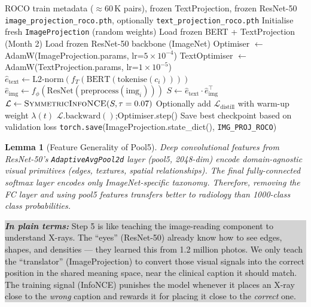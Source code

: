 \documentclass[12pt, a4paper]{article}
\theoremstyle{definition}
\theoremstyle{plain}
\newtheorem{lemma}[theorem]{Lemma}
\theoremstyle{remark}
\newcommand{\layman}[1]{%
  \vspace{4pt}%
  \noindent\colorbox{lightgray}{\parbox{\dimexpr\linewidth-2\fboxsep}{%
    \textbf{\textit{In plain terms:}} #1}}%
  \vspace{4pt}%
}
\begin{document}
\begin{algorithm}[H]
\caption{FINETUNE\_IMAGE\_PROJECTION (ROCO Domain Transfer)}
\label{alg:finetune}
\begin{algorithmic}[1]
\Require ROCO train metadata ($\approx$60\,K pairs), frozen TextProjection, frozen ResNet-50
\Ensure \texttt{image\_projection\_roco.pth}, optionally \texttt{text\_projection\_roco.pth}
\State Initialise fresh \texttt{ImageProjection} (random weights)
\State Load frozen BERT + TextProjection (Month 2)
\State Load frozen ResNet-50 backbone (ImageNet)
\State Optimiser $\gets$ AdamW(ImageProjection.params, lr=$5\times10^{-4}$)
\State TextOptimiser $\gets$ AdamW(TextProjection.params, lr=$1\times10^{-5}$) 
    \State $\hat{e}_{\text{text}} \gets \text{L2-norm}(f_T(\text{BERT}(\text{tokenise}(c_i))))$ \Comment{$[B, 512]$}
    \State $\hat{e}_{\text{img}} \gets f_\phi(\text{ResNet}(\text{preprocess}(\text{img}_i)))$ \Comment{$[B, 512]$}
    \State $S \gets \hat{e}_{\text{text}} \cdot \hat{e}_{\text{img}}^\top$ 
    \State $\mathcal{L} \gets \Call{SymmetricInfoNCE}{S, \tau=0.07}$
    \State Optionally add $\mathcal{L}_{\text{distill}}$ with warm-up weight $\lambda(t)$
    \State $\mathcal{L}.\text{backward}()$;\quad Optimiser.step()
  \EndFor
  \State Save best checkpoint based on validation loss
\EndFor
\State \texttt{torch.save}(ImageProjection.state\_dict(), \texttt{IMG\_PROJ\_ROCO})
\end{algorithmic}
\end{algorithm}

\begin{lemma}[Feature Generality of Pool5]
Deep convolutional features from ResNet-50's \texttt{AdaptiveAvgPool2d} layer (pool5, 2048-dim) encode domain-agnostic visual primitives (edges, textures, spatial relationships). The final fully-connected softmax layer encodes only ImageNet-specific taxonomy. Therefore, removing the FC layer and using pool5 features transfers better to radiology than 1000-class class probabilities.
\end{lemma}

\layman{Step 5 is like teaching the image-reading component to understand X-rays. The ``eyes'' (ResNet-50) already know how to see edges, shapes, and densities --- they learned this from 1.2 million photos. We only teach the ``translator'' (ImageProjection) to convert those visual signals into the correct position in the shared meaning space, near the clinical caption it should match. The training signal (InfoNCE) punishes the model whenever it places an X-ray close to the \emph{wrong} caption and rewards it for placing it close to the \emph{correct} one.}
\end{document}
